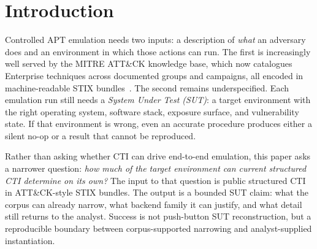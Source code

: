 \documentclass[sigconf]{acmart}
\newcommand{\stix}{STIX\xspace}
\newcommand{\mitre}{MITRE\xspace}
\newcommand{\attack}{ATT\&CK\xspace}
\begin{document}


\maketitle


\section{Introduction}\label{sec:introduction}

Controlled APT emulation needs two inputs: a description of \emph{what} an adversary does and an environment in which those actions can run. The first is increasingly well served by the \mitre{} \attack{} knowledge base, which now catalogues \enterprisetotalattackpatterncount{} Enterprise techniques across \enterprisetotalintrusionsetcount{} documented groups and \enterpriseactivecampaigncount{} campaigns, all encoded in machine-readable \stix{} bundles~\cite{strom2018mitre,DBLP:conf/uss/VirkudIR00024}. The second remains underspecified. Each emulation run still needs a \emph{System Under Test (SUT)}: a target environment with the right operating system, software stack, exposure surface, and vulnerability state. If that environment is wrong, even an accurate procedure produces either a silent no-op or a result that cannot be reproduced.

Rather than asking whether CTI can drive end-to-end emulation, this paper asks a narrower question: \emph{how much of the target environment can current structured CTI determine on its own?} The input to that question is public structured CTI in ATT\&CK-style STIX bundles. The output is a bounded SUT claim: what the corpus can already narrow, what backend family it can justify, and what detail still returns to the analyst. Success is not push-button SUT reconstruction, but a reproducible boundary between corpus-supported narrowing and analyst-supplied instantiation.
\end{document}
